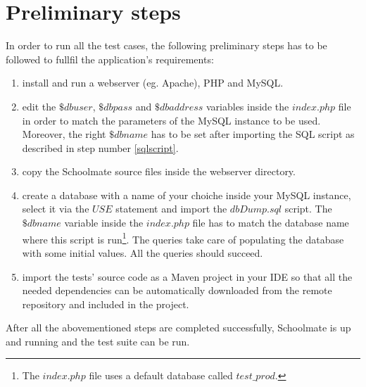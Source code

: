 \documentclass{sig-alternate-05-2015}
\begin{document}
\section{Preliminary steps}\label{steps}
In order to run all the test cases, the following preliminary steps has to be followed
to fullfil the application's requirements:
\begin{enumerate}
    \item install and run a webserver (eg. Apache), PHP and MySQL.
    \item edit the $\$dbuser$, $\$dbpass$ and $\$dbaddress$ variables inside the $index.php$ file in
        order to match the parameters of the MySQL instance to be used. Moreover, the right $\$dbname$ has to be set
        after importing the SQL script as described in step number \ref{sqlscript}.
    \item copy the Schoolmate source files inside the webserver directory.
    \item \label{sqlscript} create a database with a name of your choiche inside your MySQL instance,
        select it via the $USE$ statement and import the $dbDump.sql$ script. The $\$dbname$ variable
        inside the $index.php$ file has to match the database name where this script is run\footnote{The
        $index.php$ file uses a default database called $test\_prod$.}. The queries take care of populating
        the database with some initial values. All the queries should succeed.
    \item import the tests' source code as a Maven project in your IDE so that all the
        needed dependencies can be automatically downloaded from the remote repository
        and included in the project.
\end{enumerate}
After all the abovementioned steps are completed successfully, Schoolmate is up and running
and the test suite can be run.


%

%

%
%
\end{document}
